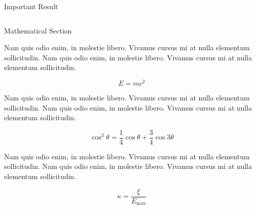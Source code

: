 \documentclass[final]{beamer}
\newlength{\onecolwid}
\newlength{\twocolwid}
\begin{document}
\begin{frame}[t]
\begin{columns}[t]
\begin{column}{\twocolwid}
\begin{alertblock}{Important Result}
            \end{alertblock}


            \begin{columns}[t,totalwidth=\twocolwid] %

                \begin{column}{\onecolwid} %


                    \begin{block}{Mathematical Section}

                        Nam quis odio enim, in molestie libero. Vivamus cursus mi at nulla elementum sollicitudin. Nam quis odio enim, in molestie libero. Vivamus cursus mi at nulla elementum sollicitudin.

                        \begin{equation}
                            E = mc^{2}
                            \label{eqn:Einstein}
                        \end{equation}

                        Nam quis odio enim, in molestie libero. Vivamus cursus mi at nulla elementum sollicitudin. Nam quis odio enim, in molestie libero. Vivamus cursus mi at nulla elementum sollicitudin.

                        \begin{equation}
                            \cos^3 \theta =\frac{1}{4}\cos\theta+\frac{3}{4}\cos 3\theta
                            \label{eq:refname}
                        \end{equation}

                        Nam quis odio enim, in molestie libero. Vivamus cursus mi at nulla elementum sollicitudin. Nam quis odio enim, in molestie libero. Vivamus cursus mi at nulla elementum sollicitudin.

                        \begin{equation}
                            \kappa =\frac{\xi}{E_{\mathrm{max}}} %
                        \end{equation}


\end{block}
\end{column}
\end{columns}
\end{column}
\end{columns}
\end{frame}
\end{document}

